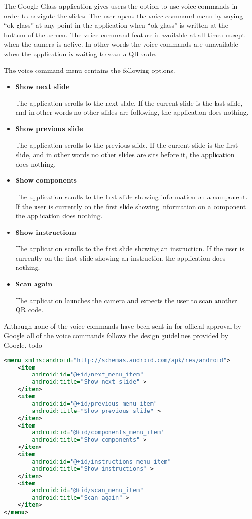 The Google Glass application gives users the option to use voice commands in order to navigate the slides. The user opens the voice command menu by saying ``ok glass'' at any point in the application when ``ok glass'' is written at the bottom of the screen. The voice command feature is available at all times except when the camera is active. In other words the voice commands are unavailable when the application is waiting to scan a QR code.

The voice command menu contains the following options.

\begin{itemize}
	\item \textbf{Show next slide}
	
	The application scrolls to the next slide. If the current slide is the last slide, and in other words no other slides are following, the application does nothing.
	\item \textbf{Show previous slide}
	
	The application scrolls to the previous slide. If the current slide is the first slide, and in other words no other slides are sits before it, the application does nothing.
	\item \textbf{Show components}
	
	The application scrolls to the first slide showing information on a component. If the user is currently on the first slide showing information on a component the application does nothing. 
	\item \textbf{Show instructions}
	
	The application scrolls to the first slide showing an instruction. If the user is currently on the first slide showing an instruction the application does nothing.
	\item \textbf{Scan again}
	
	The application launches the camera and expects the user to scan another QR code.
\end{itemize}

Although none of the voice commands have been sent in for official approval by Google all of the voice commands follows the design guidelines provided by Google. todo

\begin{lstlisting}[language=XML, caption={The voice command menu XML file}, label=todo]
<menu xmlns:android="http://schemas.android.com/apk/res/android">
	<item
		android:id="@+id/next_menu_item"
		android:title="Show next slide" >
	</item>
	<item
		android:id="@+id/previous_menu_item"
		android:title="Show previous slide" >
	</item>
	<item
		android:id="@+id/components_menu_item"
		android:title="Show components" >
	</item>
	<item
		android:id="@+id/instructions_menu_item"
		android:title="Show instructions" >
	</item>
	<item
		android:id="@+id/scan_menu_item"
		android:title="Scan again" >
	</item>
</menu>
\end{lstlisting}